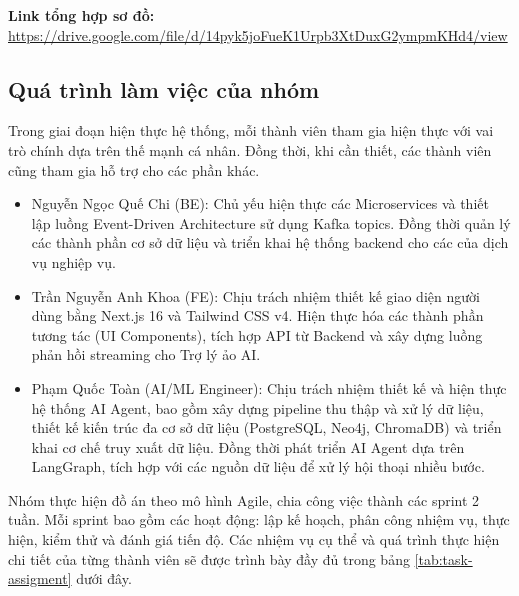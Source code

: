 \noindent
\textbf{Link tổng hợp sơ đồ:} \\
\url{https://drive.google.com/file/d/14pyk5joFueK1Urpb3XtDuxG2ympmKHd4/view}

\subsection*{Quá trình làm việc của nhóm}

Trong giai đoạn hiện thực hệ thống, mỗi thành viên tham gia hiện thực với vai trò chính dựa trên thế mạnh cá nhân. Đồng thời, khi cần thiết, các thành viên cũng tham gia hỗ trợ cho các phần khác.

\begin{itemize}
    \item Nguyễn Ngọc Quế Chi (BE): Chủ yếu hiện thực các Microservices và thiết lập luồng Event-Driven Architecture sử dụng Kafka topics. Đồng thời quản lý các thành phần cơ sở dữ liệu và triển khai hệ thống backend cho các của dịch vụ nghiệp vụ.
    \item Trần Nguyễn Anh Khoa (FE): Chịu trách nhiệm thiết kế giao diện người dùng bằng Next.js 16 và Tailwind CSS v4. Hiện thực hóa các thành phần tương tác (UI Components), tích hợp API từ Backend và xây dựng luồng phản hồi streaming cho Trợ lý ảo AI.
    \item Phạm Quốc Toàn (AI/ML Engineer): Chịu trách nhiệm thiết kế và hiện thực hệ thống AI Agent, bao gồm xây dựng pipeline thu thập và xử lý dữ liệu, thiết kế kiến trúc đa cơ sở dữ liệu (PostgreSQL, Neo4j, ChromaDB) và triển khai cơ chế truy xuất dữ liệu. Đồng thời phát triển AI Agent dựa trên LangGraph, tích hợp với các nguồn dữ liệu để xử lý hội thoại nhiều bước.
\end{itemize}

Nhóm thực hiện đồ án theo mô hình Agile, chia công việc thành các sprint 2 tuần. Mỗi sprint bao gồm các hoạt động: lập kế hoạch, phân công nhiệm vụ, thực hiện, kiểm thử và đánh giá tiến độ. Các nhiệm vụ cụ thể và quá trình thực hiện chi tiết của từng thành viên sẽ được trình bày đầy đủ trong bảng \ref{tab:task-assigment} dưới đây.

